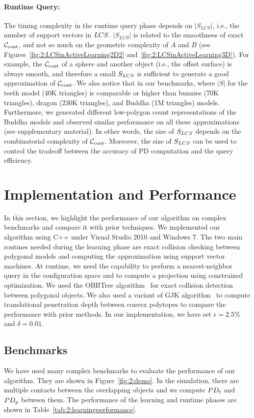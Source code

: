 \paragraph{Runtime Query:} The timing complexity in the runtime query
phase depends on $\left| S_{LCS} \right|$, i.e., the number of
support vectors in $LCS$. $\left| S_{LCS} \right|$ is related to
the smoothness of exact $\mathcal C_\text{cont}$, and not so much on the geometric complexity of $A$ and $B$ (see Figures~\ref{fig:2:LCSinActiveLearning2D2} and~\ref{fig:2:LCSinActiveLearning3D}).
For example, the $\mathcal C_\text{cont}$ of a sphere and another object (i.e., the offset surface) is always smooth, and
therefore a small $S_{LCS}$ is sufficient to generate a good approximation of $\mathcal C_\text{cont}$.
We also notice that in our benchmarks, where $|S|$ for the teeth model (40K triangles) is comparable or higher than bunnies (70K triangles), dragon (230K triangles), and Buddha (1M triangles) models. Furthermore, we generated different low-polygon count representations of the Buddha models and observed similar performance on all these approximations (see supplementary material).
In other words, the size of
$S_{LCS}$ depends on the combinatorial complexity of $\mathcal C_\text{cont}$. Moreover, the size of $S_{LCS}$
can be used to control the tradeoff between the accuracy of PD
computation and the query efficiency.



\section{Implementation and Performance}
\label{sec:2:result}
In this section, we  highlight the performance of our algorithm on complex benchmarks and compare it with prior techniques.
We implemented our algorithm using C++ under Visual Studio 2010
and Windows 7. The two main routines needed during the learning phase are exact collision checking between polygonal models and computing the approximation using support vector machines. At runtime, we need the capability to perform a nearest-neighbor query in the configuration space and to compute a projection using  constrained optimization. We used the OBBTree algorithm~\cite{Gottschalk:1996:OHS} for exact collision detection between polygonal objects.
We also used a variant of GJK algorithm~\cite{Gino:2001:GDC} to compute translational penetration depth between convex polytopes to compare the performance with prior methods. In our implementation, we have set $\epsilon=2.5\%$ and $\delta=0.01$.

\subsection{Benchmarks}
We have used many complex benchmarks to evaluate the performance of our algorithm. They are shown in Figure~\ref{fig:2:demo}. In the simulation, there are multiple contacts between the overlapping objects and we compute $PD_t$ and $PD_g$ between them. The performance of the  learning and runtime phases are shown in Table~\ref{tab:2:learningperformance}.

